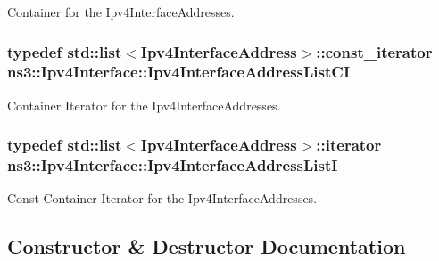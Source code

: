 Container for the Ipv4\+Interface\+Addresses. 

\subsubsection[{\texorpdfstring{Ipv4\+Interface\+Address\+List\+CI}{Ipv4InterfaceAddressListCI}}]{\setlength{\rightskip}{0pt plus 5cm}typedef {\bf std\+::list}$<${\bf Ipv4\+Interface\+Address}$>$\+::const\+\_\+iterator {\bf ns3\+::\+Ipv4\+Interface\+::\+Ipv4\+Interface\+Address\+List\+CI}\hspace{0.3cm}{\ttfamily [private]}}\hypertarget{classns3_1_1Ipv4Interface_a4dac488cd96dbcc24440e23059c132dd}{}\label{classns3_1_1Ipv4Interface_a4dac488cd96dbcc24440e23059c132dd}


Container Iterator for the Ipv4\+Interface\+Addresses. 

\subsubsection[{\texorpdfstring{Ipv4\+Interface\+Address\+ListI}{Ipv4InterfaceAddressListI}}]{\setlength{\rightskip}{0pt plus 5cm}typedef {\bf std\+::list}$<${\bf Ipv4\+Interface\+Address}$>$\+::iterator {\bf ns3\+::\+Ipv4\+Interface\+::\+Ipv4\+Interface\+Address\+ListI}\hspace{0.3cm}{\ttfamily [private]}}\hypertarget{classns3_1_1Ipv4Interface_ae60a6401347ab109569b6f6189433d7b}{}\label{classns3_1_1Ipv4Interface_ae60a6401347ab109569b6f6189433d7b}


Const Container Iterator for the Ipv4\+Interface\+Addresses. 



\subsection{Constructor \& Destructor Documentation}
